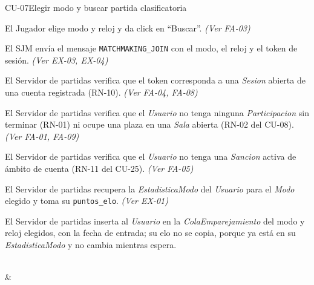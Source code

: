 \begin{fichacu}{CU-07}{Elegir modo y buscar partida clasificatoria}
{\begin{cuenum}[start=1]
      \item El Jugador elige modo y reloj y da click en ``Buscar''. \textit{(Ver \mbox{FA-03})}
      \item El SJM envía el mensaje \texttt{MATCHMAKING\_\allowbreak{}JOIN} con el modo, el reloj y el token de sesión. \textit{(Ver \mbox{EX-03}, \mbox{EX-04})}
      \item El Servidor de partidas verifica que el token corresponda a una \textit{Sesion} abierta de una cuenta registrada (\mbox{RN-10}). \textit{(Ver \mbox{FA-04}, \mbox{FA-08})}
      \item El Servidor de partidas verifica que el \textit{Usuario} no tenga ninguna \textit{Participacion} sin terminar (\mbox{RN-01}) ni ocupe una plaza en una \textit{Sala} abierta (\mbox{RN-02} del \mbox{CU-08}). \textit{(Ver \mbox{FA-01}, \mbox{FA-09})}
      \item El Servidor de partidas verifica que el \textit{Usuario} no tenga una \textit{Sancion} activa de ámbito de cuenta (\mbox{RN-11} del \mbox{CU-25}). \textit{(Ver \mbox{FA-05})}
      \item El Servidor de partidas recupera la \textit{EstadisticaModo} del \textit{Usuario} para el \textit{Modo} elegido y toma su \texttt{puntos\_\allowbreak{}elo}. \textit{(Ver \mbox{EX-01})}
      \item El Servidor de partidas inserta al \textit{Usuario} en la \textit{ColaEmparejamiento} del modo y reloj elegidos, con la fecha de entrada; su elo no se copia, porque ya está en su \textit{EstadisticaModo} y no cambia mientras espera.
    \end{cuenum}} \\
   & 
\end{fichacu}
